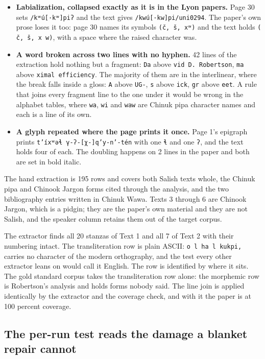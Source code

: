 \begin{itemize}
\item \textbf{Labialization, collapsed exactly as it is in the Lyon papers.} Page 30 sets \texttt{/kʷú[·kʷ]piʔ} and the text gives \texttt{/kwú[·kw]pi/uni0294}. The paper's own prose loses it too: page 30 names its symbols \texttt{(č, š, xʷ)} and the text holds \texttt{( č, š, x w)}, with a space where the raised character was.
\item \textbf{A word broken across two lines with no hyphen.} 42 lines of the extraction hold nothing but a fragment: \texttt{Da} above \texttt{vid D. Robertson}, \texttt{ma} above \texttt{ximal efficiency}. The majority of them are in the interlinear, where the break falls inside a gloss: \texttt{A} above \texttt{UG-}, \texttt{s} above \texttt{ick}, \texttt{gr} above \texttt{eet}. A rule that joins every fragment line to the one under it would be wrong in the alphabet tables, where \texttt{wa}, \texttt{wi} and \texttt{waw} are Chinuk pipa character names and each is a line of its own.
\item \textbf{A glyph repeated where the page prints it once.} Page 1's epigraph prints \texttt{t’íxʷəɬ γ-ʔ-[χ-]q’y-n’-tén} with one \texttt{ɬ} and one \texttt{ʔ}, and the text holds four of each. The doubling happens on 2 lines in the paper and both are set in bold italic.
\end{itemize}

The hand extraction is 195 rows and covers both Salish texts whole, the Chinuk pipa and Chinook Jargon forms cited through the analysis, and the two bibliography entries written in Chinuk Wawa. Texts 3 through 6 are Chinook Jargon, which is a pidgin; they are the paper's own material and they are not Salish, and the speaker column retains them out of the target corpus.

The extractor finds all 20 stanzas of Text 1 and all 7 of Text 2 with their numbering intact. The transliteration row is plain ASCII: \texttt{o l ha l kukpi,} carries no character of the modern orthography, and the test every other extractor leans on would call it English. The row is identified by where it sits. The gold standard corpus takes the transliteration row alone: the morphemic row is Robertson's analysis and holds forms nobody said. The line join is applied identically by the extractor and the coverage check, and with it the paper is at 100 percent coverage.

\subsection{The per-run test reads the damage a blanket repair cannot}


